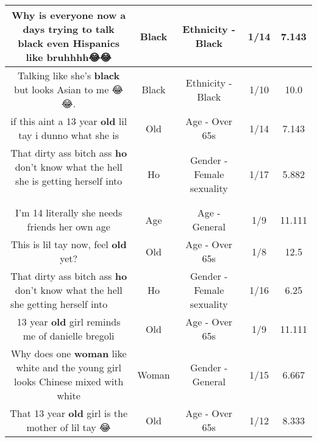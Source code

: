 \documentclass[11pt]{article}
\newlength\mylength
\begin{document}
\begin{center}
\begin{longtable}{|C{.65\mylength}|C{.30\mylength}|C{.12\mylength}|C{.12\mylength}|C{.12\mylength}|}
  \small Why is everyone now a days trying to talk \textbf{black} even Hispanics like bruhhhh😂😂\normalsize   & Black & Ethnicity - Black & 1/14 & 7.143 \\  \hline
  \small Talking like she's \textbf{black} but looks Asian to me 😂😂.\normalsize   & Black & Ethnicity - Black & 1/10 & 10.0 \\  \hline
  \small if this aint a 13 year \textbf{old} lil tay i dunno what she is\normalsize   & Old & Age - Over 65s & 1/14 & 7.143 \\  \hline
  \small That dirty ass bitch ass \textbf{ho} don't know what the hell she is getting herself into 🤦🏼‍♀️🤦🏼‍♀️🖕🏼🖕🏼\normalsize   & Ho & Gender - Female sexuality & 1/17 & 5.882 \\  \hline
  \small I'm 14  literally she needs friends her own age\normalsize   & Age & Age - General & 1/9 & 11.111 \\  \hline
  \small This is lil tay now, feel \textbf{old} yet?\normalsize   & Old & Age - Over 65s & 1/8 & 12.5 \\  \hline
  \small That dirty ass bitch ass \textbf{ho} don't know what the hell she getting herself into 🤦🏼‍♀️🤦🏼‍♀️\normalsize   & Ho & Gender - Female sexuality & 1/16 & 6.25 \\  \hline
  \small 13 year \textbf{old} girl reminds me of danielle bregoli\normalsize   & Old & Age - Over 65s & 1/9 & 11.111 \\  \hline
  \small Why does one \textbf{woman} like white and the young girl looks Chinese mixed with white\normalsize   & Woman & Gender - General & 1/15 & 6.667 \\  \hline
  \small That 13 year \textbf{old} girl is the mother of lil tay 😂\normalsize   & Old & Age - Over 65s & 1/12 & 8.333 \\  \hline

\end{longtable}
\end{center}
\end{document}
